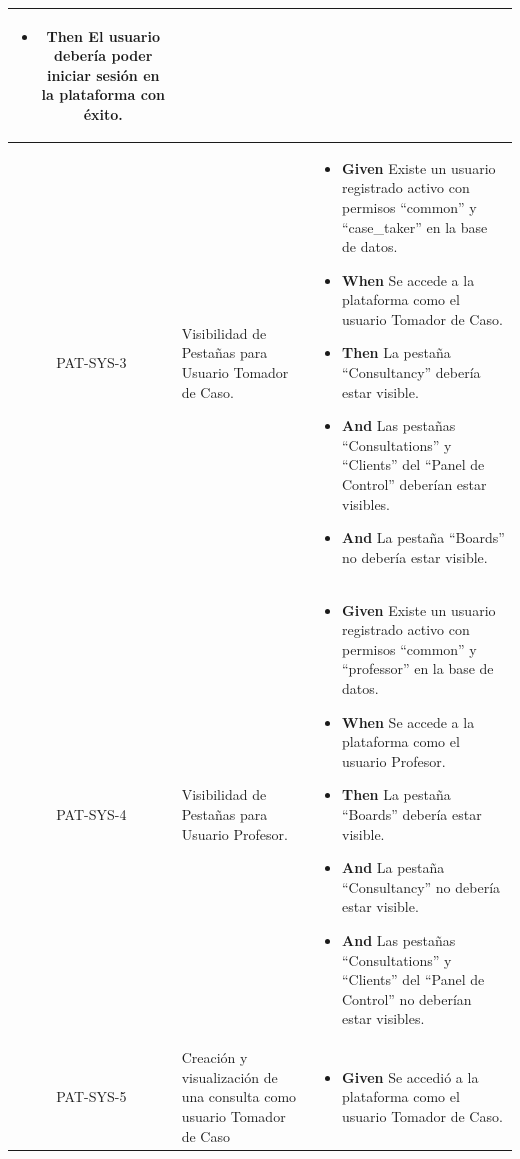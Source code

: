 \begin{longtable}{|c|p{2.5cm}|p{10.5cm}|}
\begin{itemize}
        \newline
        \item \textbf{Then} El usuario debería poder iniciar sesión en la plataforma con éxito.
    \end{itemize}
    \\
    \hline
    PAT-SYS-3 & Visibilidad de Pestañas para Usuario Tomador de Caso.  &          
    \begin{itemize}
        \item \textbf{Given} Existe un usuario registrado activo con permisos ``common'' y ``case\_taker'' en la base de datos.
        \newline
        \item \textbf{When} Se accede a la plataforma como el usuario Tomador de Caso.
        \newline
        \item \textbf{Then} La pestaña ``Consultancy'' debería estar visible.
        \item \textbf{And} Las pestañas ``Consultations'' y ``Clients'' del ``Panel de Control'' deberían estar visibles.
        \item \textbf{And} La pestaña ``Boards'' no debería estar visible.
    \end{itemize}
    \\
    \hline
    PAT-SYS-4 & Visibilidad de Pestañas para Usuario Profesor. &  
    \begin{itemize}
        \item \textbf{Given} Existe un usuario registrado activo con permisos ``common'' y ``professor'' en la base de datos.
        \newline
        \item \textbf{When} Se accede a la plataforma como el usuario Profesor.
        \newline
        \item \textbf{Then} La pestaña ``Boards'' debería estar visible.
        \item \textbf{And} La pestaña ``Consultancy'' no debería estar visible.
        \item \textbf{And} Las pestañas ``Consultations'' y ``Clients'' del ``Panel de Control'' no deberían estar visibles.
    \end{itemize}   
    \\
    \hline
    PAT-SYS-5 & Creación y visualización de una consulta como usuario Tomador de Caso & 
    \begin{itemize}
        \item \textbf{Given} Se accedió a la plataforma como el usuario Tomador de Caso.

\end{itemize}
\end{longtable}
